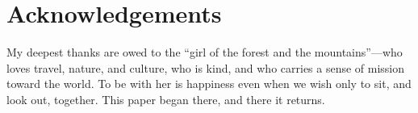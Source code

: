 \section*{Acknowledgements}
\label{p19:sec:ack}

\noindent
My deepest thanks are owed to the ``girl of the forest and the mountains''---who loves travel, nature, and culture, who is kind, and who carries a sense of mission toward the world. To be with her is happiness even when we wish only to sit, and look out, together. This paper began there, and there it returns.
